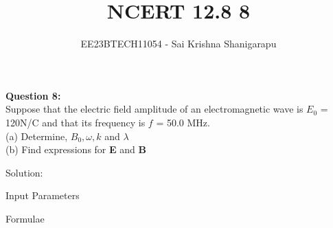 \documentclass[journal,12pt,twocolumn]{IEEEtran}
\theoremstyle{remark}
\begin{document}

\vspace{3cm}

\title{NCERT 12.8 8}
\author{EE23BTECH11054 - Sai Krishna Shanigarapu%
}
\maketitle
\newpage
\bigskip

\begin{flushleft}
\textbf{Question 8:}\\
Suppose that the electric field amplitude of an electromagnetic wave is $E_0$ = 120N/C and that its frequency is $f$ = 50.0 MHz.\\
(a) Determine, $B_0, \omega, k$ and $\lambda$\\
(b) Find expressions for \textbf{E} and \textbf{B}\\
\end{flushleft}

\bigskip

\begin{flushleft}
Solution:
\end{flushleft}

\begin{center}
    \begin{table}[ht]
        \caption{Input Parameters}
        
        \label{tab:table1.12.8.8}
    \end{table}
\end{center}

\begin{flushleft}
    \begin{table}[ht]
       \caption{Formulae}
       
       \label{tab:table2.12.8.8}
    \end{table}
\bigskip
\end{flushleft}

\bigskip
%
%
%
%
\end{document}
